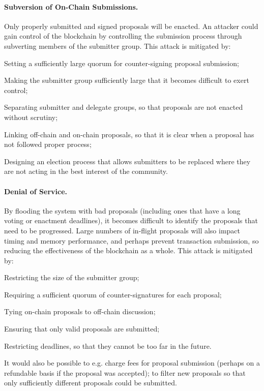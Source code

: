 \paragraph{Subversion of On-Chain Submissions.}
Only properly submitted and signed proposals will be enacted.  An attacker could gain control of the blockchain by controlling the submission process through
subverting members of the submitter group.
%
This attack is mitigated by:
  \begin{inparaenum}
  \item
    Setting a sufficiently large quorum
    for counter-signing proposal submission;
  \item
    Making the submitter group sufficiently large that it becomes difficult to exert control;
  \item
    Separating submitter and delegate groups, so that proposals are not enacted without scrutiny;
  \item
    Linking off-chain and on-chain proposals, so that it is clear when a proposal has not followed proper process;
  \item
    Designing an election process that allows submitters to be replaced where they are not acting in the best interest of the community.
  \end{inparaenum}


\paragraph{Denial of Service.}
By flooding the system with bad proposals (including ones that have a long voting or enactment deadlines), it becomes difficult to identify the
proposals that need to be progressed.
Large numbers of in-flight proposals will also impact timing and memory performance, and perhaps prevent transaction submission, so reducing
the effectiveness of the blockchain as a whole.
%
This attack is mitigated by:
  \begin{inparaenum}
  \item
    Restricting the size of the submitter group;
  \item
    Requiring a sufficient quorum of counter-signatures for each proposal;
  \item
    Tying on-chain proposals to off-chain discussion;
  \item
    Ensuring that only valid proposals are submitted;
  \item
    Restricting deadlines, so that they cannot be too far in the future.
  \end{inparaenum}
  It would also be possible to e.g. charge fees for proposal submission (perhaps on a refundable basis if the proposal was accepted);
  to filter new proposals so that only sufficiently different proposals could be submitted.

